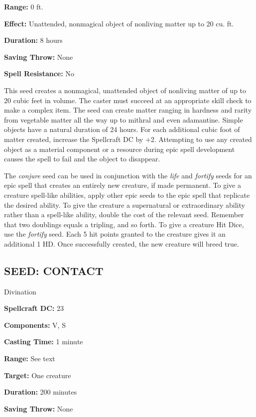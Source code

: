 \documentclass{article}
\begin{document}
\textbf{Range:} 0 ft.

\textbf{Effect:} Unattended, nonmagical object of nonliving matter up to 20 cu. 
ft. 

\textbf{Duration:} 8 hours 

\textbf{Saving Throw:} None 

\textbf{Spell Resistance:} No 

This seed creates a nonmagical, unattended object of nonliving matter of up to 
20 cubic feet in volume. The caster must succeed at an appropriate skill check 
to make a complex item. The seed can create matter ranging in hardness and rarity 
from vegetable matter all the way up to mithral and even adamantine. Simple objects 
have a natural duration of 24 hours. For each additional cubic foot of matter created, 
increase the Spellcraft DC by +2. Attempting to use any created object as a material 
component or a resource during epic spell development causes the spell to fail 
and the object to disappear. 

The \textit{conjure }seed can be used in conjunction with the \textit{life }and 
\textit{fortify }seeds for an epic spell that creates an entirely new creature, 
if made permanent. To give a creature spell-like abilities, apply other epic seeds 
to the epic spell that replicate the desired ability. To give the creature a supernatural 
or extraordinary ability rather than a spell-like ability, double the cost of the 
relevant seed. Remember that two doublings equals a tripling, and so forth. To 
give a creature Hit Dice, use the \textit{fortify }seed. Each 5 hit points granted 
to the creature gives it an additional 1 HD. Once successfully created, the new 
creature will breed true. 

\vspace{12pt}
\subsection*{SEED: CONTACT }

Divination 

\textbf{Spellcraft DC:} 23 

\textbf{Components:} V, S 

\textbf{Casting Time:} 1 minute 

\textbf{Range:} See text 

\textbf{Target:} One creature 

\textbf{Duration:} 200 minutes 

\textbf{Saving Throw:} None 
\end{document}
